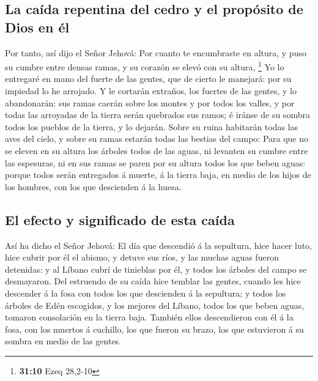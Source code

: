 \hypertarget{la-cauxedda-repentina-del-cedro-y-el-propuxf3sito-de-dios-en-uxe9l}{%
\subsection{La caída repentina del cedro y el propósito de Dios en
él}\label{la-cauxedda-repentina-del-cedro-y-el-propuxf3sito-de-dios-en-uxe9l}}

 Por tanto, así dijo el Señor Jehová: Por cuanto te
encumbraste en altura, y puso su cumbre entre densas ramas, y su corazón
se elevó con su altura, \footnote{\textbf{31:10} Ezeq 28,2-10}
 Yo lo entregaré en mano del fuerte de las gentes, que de
cierto le manejará: por su impiedad lo he arrojado.  Y le
cortarán extraños, los fuertes de las gentes, y lo abandonarán: sus
ramas caerán sobre los montes y por todos los valles, y por todas las
arroyadas de la tierra serán quebrados sus ramos; é iránse de su sombra
todos los pueblos de la tierra, y lo dejarán.  Sobre su
ruina habitarán todas las aves del cielo, y sobre su ramas estarán todas
las bestias del campo:  Para que no se eleven en su
altura los árboles todos de las aguas, ni levanten su cumbre entre las
espesuras, ni en sus ramas se paren por su altura todos los que beben
aguas: porque todos serán entregados á muerte, á la tierra baja, en
medio de los hijos de los hombres, con los que descienden á la huesa.

\hypertarget{el-efecto-y-significado-de-esta-cauxedda}{%
\subsection{El efecto y significado de esta
caída}\label{el-efecto-y-significado-de-esta-cauxedda}}

 Así ha dicho el Señor Jehová: El día que descendió á la
sepultura, hice hacer luto, hice cubrir por él el abismo, y detuve sus
ríos, y las muchas aguas fueron detenidas: y al Líbano cubrí de
tinieblas por él, y todos los árboles del campo se desmayaron.
 Del estruendo de su caída hice temblar las gentes,
cuando les hice descender á la fosa con todos los que descienden á la
sepultura; y todos los árboles de Edén escogidos, y los mejores del
Líbano, todos los que beben aguas, tomaron consolación en la tierra
baja.  También ellos descendieron con él á la fosa, con
los muertos á cuchillo, los que fueron su brazo, los que estuvieron á su
sombra en medio de las gentes.

